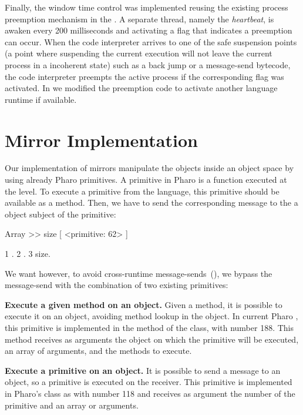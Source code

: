 Finally, the window time control was implemented reusing the existing process preemption mechanism in the \VM. A separate thread, namely the \emph{heartbeat}, is awaken every 200 milliseconds and activating a flag that indicates a preemption can occur. When the \VM code interpreter arrives to one of the safe suspension points (\ie a point where suspending the current execution will not leave the current process in a incoherent state) such as a back jump or a message-send bytecode, the code interpreter preempts the active process if the corresponding flag was activated. In \Vtt we modified the preemption code to activate another language runtime if available.

\section{Mirror Implementation}\label{sec:implementation_mirrors}

Our implementation of mirrors manipulate the objects inside an object space by using already Pharo \VM primitives. A primitive in Pharo is a function executed at the \VM level. To execute a primitive from the language, this primitive should be available as a method. Then, we have to send the corresponding message to the a object subject of the primitive:

\begin{code}
Array >> size [
    <primitive: 62>
]

{1 . 2 . 3} size.
\end{code}

We want however, to avoid cross-runtime message-sends~(), we bypass the message-send with the combination of two existing primitives:
\begin{description}
	\item \textbf{Execute a given method on an object.} Given a method, it is possible to execute it on an object, avoiding method lookup in the object. In current Pharo \VM, this primitive is implemented in the method \textbf{} of the  class, with number 188. This method receives as arguments the object on which the primitive will be executed, an array of arguments, and the methods to execute.
	\item \textbf{Execute a primitive on an object.} It is possible to send a message to an object, so a primitive is executed on the receiver. This primitive is implemented in Pharo's  class as \textbf{} with number 118 and receives as argument the number of the primitive and an array or arguments.
\end{description}

